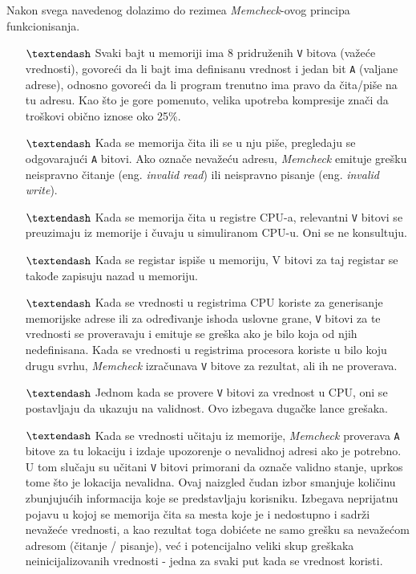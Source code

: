 \documentclass[12pt,oneside]{memoir}
\theoremstyle{plain}
\theoremstyle{definition}
\begin{document}
Nakon svega navedenog dolazimo do rezimea \textit{Memcheck}-ovog principa funkcionisanja.
\begin{itemize}
\item[$\textendash$] Svaki bajt u memoriji ima 8 pridruženih \texttt{V} bitova (važeće vrednosti), govoreći da li bajt ima definisanu vrednost i jedan bit \texttt{A} (valjane adrese), odnosno govoreći da li program trenutno ima pravo da čita/piše na tu adresu. Kao što je gore pomenuto, velika upotreba kompresije znači da troškovi obično iznose oko 25\%.
\item[$\textendash$] Kada se memorija čita ili se u nju piše, pregledaju se odgovarajući \texttt{A} bitovi. Ako označe nevažeću adresu, \textit{Memcheck} emituje grešku neispravno čitanje (eng. \textit{invalid read}) ili neispravno pisanje (eng. \textit{invalid write}).
\item[$\textendash$] Kada se memorija čita u registre CPU-a, relevantni \texttt{V} bitovi se preuzimaju iz memorije i čuvaju u simuliranom CPU-u. Oni se ne konsultuju.
\item[$\textendash$] Kada se registar ispiše u memoriju, V bitovi za taj registar se takođe zapisuju nazad u memoriju.
\item[$\textendash$] Kada se vrednosti u registrima CPU koriste za generisanje memorijske adrese ili za određivanje ishoda uslovne grane, \texttt{V} bitovi za te vrednosti se proveravaju i emituje se greška ako je bilo koja od njih nedefinisana. Kada se vrednosti u registrima procesora koriste u bilo koju drugu svrhu, \textit{Memcheck} izračunava \texttt{V} bitove za rezultat, ali ih ne proverava.
\item[$\textendash$] Jednom kada se provere \texttt{V} bitovi za vrednost u CPU, oni se postavljaju da ukazuju na validnost. Ovo izbegava dugačke lance grešaka.
\item[$\textendash$] Kada se vrednosti učitaju iz memorije, \textit{Memcheck} proverava \texttt{A} bitove za tu lokaciju i izdaje upozorenje o nevalidnoj adresi ako je potrebno. U tom slučaju su učitani \texttt{V} bitovi primorani da označe validno stanje, uprkos tome što je lokacija nevalidna. Ovaj naizgled čudan izbor smanjuje količinu zbunjujućih informacija koje se predstavljaju korisniku. Izbegava neprijatnu pojavu u kojoj se memorija čita sa mesta koje je i nedostupno i sadrži nevažeće vrednosti, a kao rezultat toga dobićete ne samo grešku sa nevažećom adresom (čitanje / pisanje), već i potencijalno veliki skup greškaka neinicijalizovanih vrednosti - jedna za svaki put kada se vrednost koristi.
\end{itemize}
\end{document}
